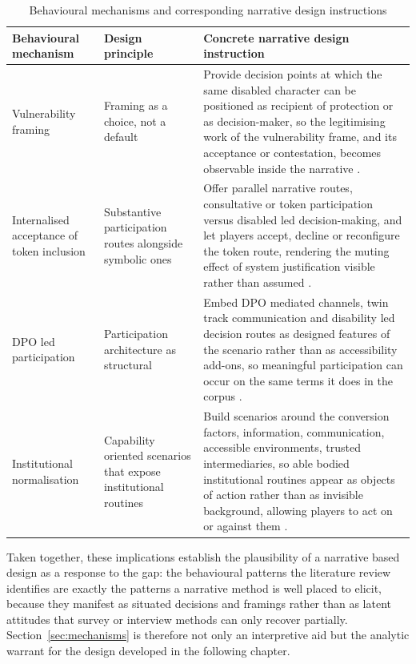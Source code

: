 \documentclass[12pt,a4paper]{report}
\begin{document}
\begin{table}[H]
\centering
\small
\renewcommand{\arraystretch}{1.3}
\caption{Behavioural mechanisms and corresponding narrative design instructions}
\label{tab:narrative-design-instructions}
\begin{tabularx}{\textwidth}{>{\raggedright\arraybackslash}p{} >{\raggedright\arraybackslash}p{} >{\raggedright\arraybackslash}X}
\toprule
\textbf{Behavioural mechanism} & \textbf{Design principle} & \textbf{Concrete narrative design instruction} \\
\midrule
Vulnerability framing
& Framing as a choice, not a default
& Provide decision points at which the same disabled character can be positioned as recipient of protection or as decision-maker, so the legitimising work of the vulnerability frame, and its acceptance or contestation, becomes observable inside the narrative \cite{stjernholm2025critical,sidanius_pratto_1999_socdom}. \\
\midrule
Internalised acceptance of token inclusion
& Substantive participation routes alongside symbolic ones
& Offer parallel narrative routes, consultative or token participation versus disabled led decision-making, and let players accept, decline or reconfigure the token route, rendering the muting effect of system justification visible rather than assumed \cite{jost_2003_decade,setijaningrum2024tokenism}. \\
\midrule
DPO led participation
& Participation architecture as structural
& Embed DPO mediated channels, twin track communication and disability led decision routes as designed features of the scenario rather than as accessibility add-ons, so meaningful participation can occur on the same terms it does in the corpus \cite{pertiwi2019dpo,villeneuve2017dpo,craig2023twintrack,rahatiningtyas2025yogyakarta}. \\
\midrule
Institutional normalisation
& Capability oriented scenarios that expose institutional routines
& Build scenarios around the conversion factors, information, communication, accessible environments, trusted intermediaries, so able bodied institutional routines appear as objects of action rather than as invisible background, allowing players to act on or against them \cite{sen_1999_development,ton2021agency,villeneuve2021pcep,brown2025massachusetts}. \\
\bottomrule
\end{tabularx}
\end{table}

Taken together, these implications establish the plausibility of a narrative based design as a response to the gap: the behavioural patterns the literature review identifies are exactly the patterns a narrative method is well placed to elicit, because they manifest as situated decisions and framings rather than as latent attitudes that survey or interview methods can only recover partially. Section~\ref{sec:mechanisms} is therefore not only an interpretive aid but the analytic warrant for the design developed in the following chapter.
\end{document}
